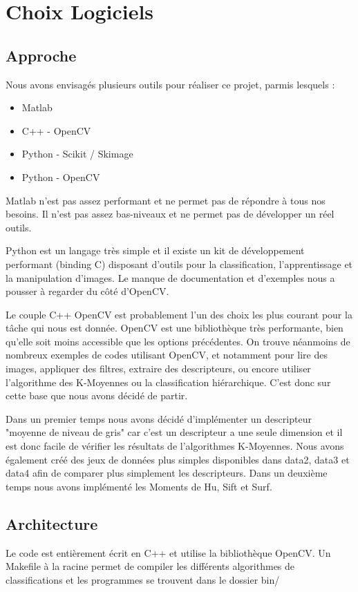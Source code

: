 \documentclass[12pt,a4paper,utf8x]{report}
\begin{document}
\chapter{Choix Logiciels}

\section{Approche}
    Nous avons envisagés plusieurs outils pour réaliser ce projet, parmis lesquels :

    \begin{itemize}
        \item Matlab
        \item C++ - OpenCV
        \item Python - Scikit / Skimage
        \item Python - OpenCV
    \end{itemize}

    Matlab n'est pas assez performant et ne permet pas de répondre à tous nos besoins. Il n'est pas assez bas-niveaux et ne permet pas de développer un réel outils.

    Python est un langage très simple et il existe un kit de développement performant (binding C) disposant d'outils pour la classification, l'apprentissage et la manipulation d'images. Le manque de documentation et d'exemples nous a pousser à regarder du côté d'OpenCV.

    Le couple C++ OpenCV est probablement l'un des choix les plus courant pour la tâche qui nous est donnée. OpenCV est une bibliothèque très performante, bien qu'elle soit moins accessible que les options précédentes. On trouve néanmoins de nombreux exemples de codes utilisant OpenCV, et notamment pour lire des images, appliquer des filtres, extraire des descripteurs, ou encore utiliser l'algorithme des K-Moyennes ou la classification hiérarchique. C'est donc sur cette base que nous avons décidé de partir.

    Dans un premier temps nous avons décidé d'implémenter un descripteur "moyenne de niveau de gris" car c'est un descripteur a une seule dimension et il est donc facile de vérifier les résultats de l'algorithmes K-Moyennes. Nous avons également créé des jeux de données plus simples disponibles dans data2, data3 et data4 afin de comparer plus simplement les descripteurs. Dans un deuxième temps nous avons implémenté les Moments de Hu, Sift et Surf.


\section{Architecture}
    Le code est entièrement écrit en C++ et utilise la bibliothèque OpenCV. Un Makefile à la racine permet de compiler les différents algorithmes de classifications et les programmes se trouvent dans le dossier bin/
\end{document}
